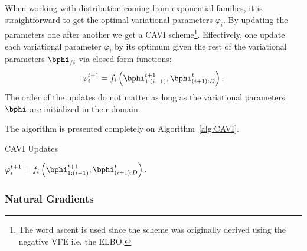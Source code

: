 When working with distribution coming from exponential families, it is straightforward to get the optimal variational parameters $\varphi_i$.
By updating the parameters one after another we get a \ac{CAVI} scheme\footnote{The word ascent is used since the scheme was originally derived using the negative \ac{VFE} i.e. the \ac{ELBO}.}.
Effectively, one update each variational parameter $\varphi_i$ by its optimum given the rest of the variational parameters $\bphi_{/i}$ via closed-form functions:
\begin{align}
\varphi_i^{t+1} = f_i\left(\bphi_{1:(i-1)}^{t+1}, \bphi_{(i+1):D}^t\right).
\end{align}
The order of the updates do not matter as long as the variational parameters $\bphi$ are initialized in their domain.

The algorithm is presented completely on Algorithm~\ref{alg:CAVI}.

\begin{algorithm}
    \caption{\ac{CAVI} Updates}
    \label{alg:CAVI}
    \begin{algorithmic}
                \State $\varphi_i^{t+1} = f_i\left(\bphi_{1:(i-1)}^{t+1}, \bphi_{(i+1):D}^t\right).$
            \EndFor
        \EndWhile
    \end{algorithmic}
\end{algorithm}


\subsubsection{Natural Gradients}

